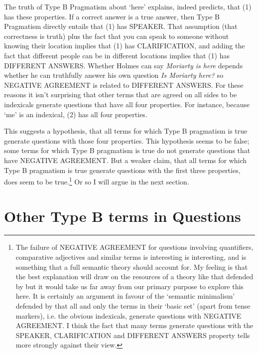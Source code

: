 \noindent The truth of Type B Pragmatism about `here' explains, indeed predicts, that (1) has these properties. If a correct answer is a true answer, then Type B Pragmatism directly entails that (1) has SPEAKER. That assumption (that correctness is truth) plus the fact that you can speak to someone without knowing their location implies that (1) has CLARIFICATION, and adding the fact that different people can be in different locations implies that (1) has DIFFERENT ANSWERS. Whether Holmes can say \textit{Moriarty is here} depends whether he can truthfully answer his own question \textit{Is Moriarty here?} so NEGATIVE AGREEMENT is related to DIFFERENT ANSWERS. For these reasons it isn't surprising that other terms that are agreed on all sides to be indexicals generate questions that have all four properties. For instance, because `me' is an indexical, (2) has all four properties.


\noindent This suggests a hypothesis, that all terms for which Type B pragmatism is true generate questions with those four properties. This hypothesis seems to be false; some terms for which Type B pragmatism is true do not generate questions that have NEGATIVE AGREEMENT. But a weaker claim, that all terms for which Type B pragmatism is true generate questions with the first three properties, does seem to be true.\footnote{The failure of NEGATIVE AGREEMENT for questions involving quantifiers, comparative adjectives and similar terms is interesting is interesting, and is something that a full semantic theory should account for. My feeling is that the best explanation will draw on the resources of a theory like that defended by \citet{Stanley2000-STACAL, Stanley2002-STANR} but it would take us far away from our primary purpose to explore this here. It is certainly an argument in favour of the `semantic minimalism' defended by \citet{Cappelen2005} that all and only the terms in their `basic set' (apart from tense markers), i.e. the obvious indexicals, generate questions with NEGATIVE AGREEMENT. I think the fact that many terms generate questions with the SPEAKER, CLARIFICATION and DIFFERENT ANSWERS property tells more strongly against their view.} Or so I will argue in the next section.

\section{Other Type B terms in Questions}

